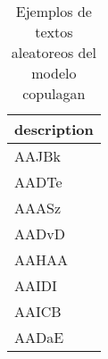 \begin{table}[H]
\centering
\fontsize{8}{14}\selectfont
\caption{Ejemplos de textos aleatoreos del modelo copulagan}
\label{table-sample10-economicos-a-1-copulagan-text}
\begin{tabular}{|m{45em}|}
\hline
\rowcolor[gray]{0.8}
description \\
\hline AAJBk \\
\hline AADTe \\
\hline AAASz \\
\hline AADvD \\
\hline AAHAA \\
\hline AAIDI \\
\hline AAICB \\
\hline AADaE \\
\hline
\end{tabular}
\end{table}
